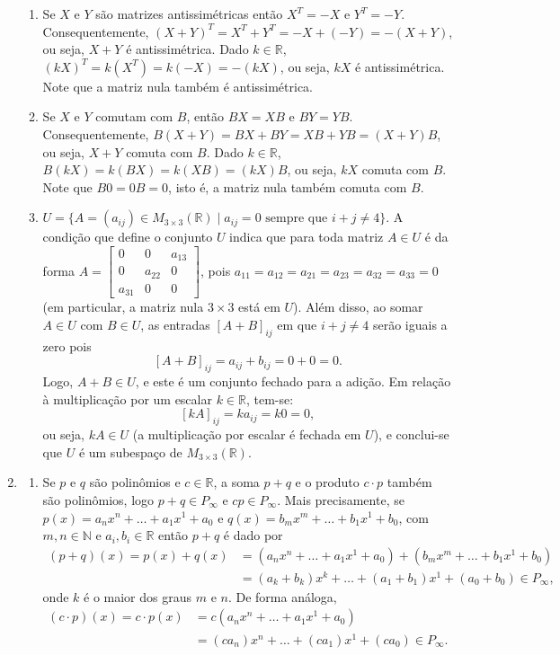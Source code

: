 \documentclass[12pt,a4paper]{article}
\newcommand*\N{\mathbb{N}}
\newcommand*\R{\mathbb{R}}
\begin{document}
\begin{enumerate}
\begin{enumerate}
\item Se $X$ e $Y$ são matrizes antissimétricas então $X^T = -X$ e $Y^T = -Y$. Consequentemente, $(X+Y)^T = X^T+Y^T = -X + (-Y) = -(X+Y)$, ou seja, $X+Y$ é antissimétrica. Dado $k \in \R$, $(kX)^T = k(X^T) = k(-X) = -(kX)$, ou seja, $kX$ é antissimétrica. Note que a matriz nula também é antissimétrica.
\item Se $X$ e $Y$ comutam com $B$, então $BX = XB$ e $BY = YB$. Consequentemente, $B(X+Y) = BX+BY = XB + YB = (X+Y)B$, ou seja, $X+Y$ comuta com $B$. Dado $k \in \R$, $B(kX) = k(BX) = k(XB) = (kX)B$, ou seja, $kX$ comuta com $B$. Note que $B0 = 0B = 0$, isto é, a matriz nula também comuta com $B$.

\item
$U = \{ A = (a_{ij}) \in M_{3 \times 3}(\R) \mid a_{ij} = 0 \text{ sempre que } i + j \neq 4 \}$.
A condição que define o conjunto $U$ indica que para toda matriz $A \in U$ é da forma $A = \begin{bmatrix}
     0 &      0 & a_{13}\\
     0 & a_{22} & 0     \\
a_{31} &      0 & 0
\end{bmatrix}$, pois $a_{11} = a_{12} = a_{21} = a_{23} = a_{32} = a_{33} = 0$ (em particular, a matriz nula $3 \times 3$ está em $U$). Além disso, ao somar $A \in U$ com $B \in U$, as entradas $[A+B]_{ij}$ em que $i+j \neq 4$ serão iguais a zero pois
\[[A+B]_{ij} = a_{ij} + b_{ij} = 0 + 0 = 0.\]
Logo, $A+B \in U$, e este é um conjunto fechado para a adição. Em relação à multiplicação por um escalar $k \in \R$, tem-se:
\[[kA]_{ij} = ka_{ij} = k0 = 0,\]
ou seja, $kA \in U$ (a multiplicação por escalar é fechada em $U$), e conclui-se que $U$ é um subespaço de $M_{3 \times 3} (\R)$.
\end{enumerate}
\item
\begin{enumerate}
\item
Se $p$ e $q$ são polinômios e $c \in \R$, a soma $p+q$ e o produto $c \cdot p$ também são polinômios, logo $p + q \in P_\infty$ e $cp \in P_\infty$. Mais precisamente, se $p(x) = a_n x^n + \ldots + a_1 x^1 + a_0$ e $q(x) = b_m x^m + \ldots + b_1 x^1 + b_0$, com $m, n \in \N$ e $a_i,b_i \in \R$ então $p + q$ é dado por
\begin{align*}
(p + q)(x)
= p(x)+q(x)
& = (a_n x^n + \ldots + a_1 x^1 + a_0)
  + (b_m x^m + \ldots + b_1 x^1 + b_0) \\
& = (a_k + b_k) x^k + \ldots + (a_1+b_1) x^1 + (a_0+b_0) \in P_\infty,
\end{align*}
onde $k$ é o maior dos graus $m$ e $n$. De forma análoga,
\begin{align*}
(c \cdot p)(x)
= c \cdot p(x)
& = c(a_n x^n + \ldots + a_1 x^1 + a_0) \\
& = (ca_n) x^n + \ldots + (ca_1) x^1 + (ca_0) \in P_\infty.
\end{align*}


\end{enumerate}
\end{enumerate}
\end{document}
